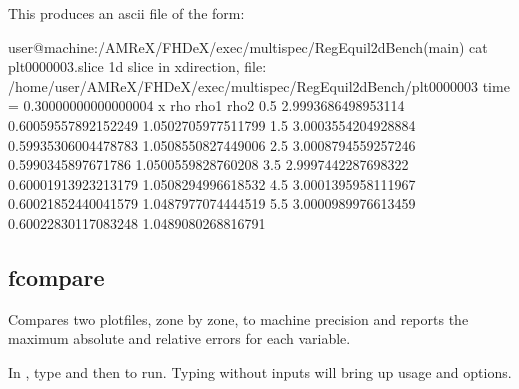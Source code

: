 \documentclass[letterpaper,10pt,english]{sphinxmanual}
\begin{document}
\sphinxAtStartPar
This produces an ascii file of the form:

\begin{sphinxVerbatim}[commandchars=\\\{\}]
user@machine:\PYGZti{}/AMReX/FHDeX/exec/multispec/Reg\PYGZus{}Equil\PYGZus{}2d\PYGZus{}Bench(main)\PYGZdl{} cat plt0000003.slice
\PYGZsh{} 1\PYGZhy{}d slice in x\PYGZhy{}direction, file: /home/user/AMReX/FHDeX/exec/multispec/Reg\PYGZus{}Equil\PYGZus{}2d\PYGZus{}Bench/plt0000003
\PYGZsh{} time =  0.30000000000000004
\PYGZsh{}                       x                      rho                     rho1                     rho2
                      0.5       2.9993686498953114      0.60059557892152249       1.0502705977511799
                      1.5       3.0003554204928884      0.59935306004478783       1.0508550827449006
                      2.5       3.0008794559257246       0.5990345897671786       1.0500559828760208
                      3.5       2.9997442287698322      0.60001913923213179       1.0508294996618532
                      4.5       3.0001395958111967      0.60021852440041579       1.0487977074444519
                      5.5       3.0000989976613459      0.60022830117083248       1.0489080268816791
\end{sphinxVerbatim}

\begin{DUlineblock}{0em}
\item[] 
\end{DUlineblock}


\subsection{fcompare}
\label{\detokenize{Post_Processing:fcompare}}
\sphinxAtStartPar
Compares two plotfiles, zone by zone, to machine precision
and reports the maximum absolute and relative errors for each
variable.

\sphinxAtStartPar
{}

\sphinxAtStartPar
In , type  and then  to run.
Typing  without inputs will bring up usage and options.

\sphinxAtStartPar
{}
\end{document}
